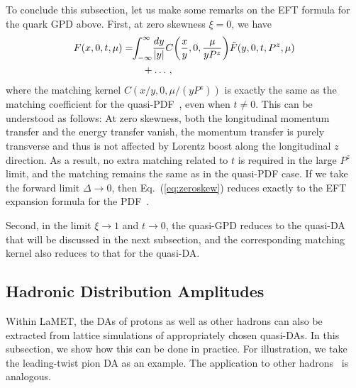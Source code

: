 \documentclass[aps,rmp,reprint,amsmath,amssymb,graphicx,longbibliography]{revtex4-1} %
\newcommand{\nn}{\nonumber}
\begin{document}
To conclude this subsection, let us make some remarks on the EFT formula for the quark GPD above. First, at zero skewness $\xi=0$, we have
\begin{align} \label{eq:zeroskew}
	F(x,0,t,\mu)&=\!\! \int_{-\infty}^\infty\! {dy\over |y|}C\!\left({x\over y}, 0, {\mu \over y{P}^z }\right)\! {\tilde F}(y,0,t,P^z,\mu)\nn\\
	&\qquad +\ldots\,,
\end{align}
where the matching kernel $C(x/y,0,\mu/(yP^z))$ is exactly the same as the matching coefficient for the quasi-PDF~\cite{Izubuchi:2018srq}, even when $t\neq0$. This can be understood as follows: At zero skewness, both the longitudinal momentum transfer and the energy transfer vanish, the momentum transfer is purely transverse and thus is not affected by Lorentz boost along the longitudinal $z$ direction. As a result, no extra matching related to $t$ is required in the large $P^z$ limit, and the matching remains the same as in the quasi-PDF case. If we take the forward limit $\Delta \to0$, then Eq.~(\ref{eq:zeroskew}) reduces exactly to the EFT expansion formula for the PDF~\cite{Ji:2015qla,Izubuchi:2018srq}.

Second, in the limit $\xi\to1$ and $t\to0$, the quasi-GPD reduces to the quasi-DA that will be discussed in the next subsection, and the corresponding matching kernel also reduces to that for the quasi-DA.


\subsection{Hadronic Distribution Amplitudes}
\label{sec:others-da}

Within LaMET, the DAs of protons as well as other hadrons can also be extracted from lattice simulations of appropriately chosen quasi-DAs. In this subsection, we show how this can be done in practice. For illustration, we take the leading-twist pion DA as an example. The application to other hadrons~\cite{Chen:2017gck,Wang:2019msf} is analogous.
\end{document}
